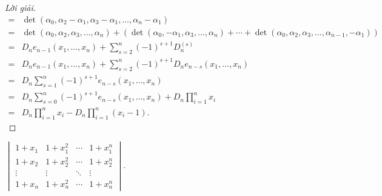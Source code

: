 \documentclass[class=nhvh-linear-algebra,crop=false]{standalone}
\begin{document}
\begin{proof}[Lời giải]
\begin{align*}
		= & \det(\alpha_{0}, \alpha_{2} - \alpha_{1}, \alpha_{3} - \alpha_{1}, \ldots, \alpha_{n} - \alpha_{1})                                                                                                                              \\
		= & \det(\alpha_{0}, \alpha_{2}, \alpha_{3}, \ldots, \alpha_{n}) + \left(\det(\alpha_{0}, -\alpha_{1}, \alpha_{3}, \ldots, \alpha_{n}) + \cdots + \det(\alpha_{0}, \alpha_{2}, \alpha_{3}, \ldots, \alpha_{n-1}, -\alpha_{1})\right) \\
		= & D_{n}e_{n-1}(x_{1}, \ldots, x_{n}) + \sum^{n}_{s=2}{(-1)}^{s+1}D^{(s)}_{n}                                                                                                                                                       \\
		= & D_{n}e_{n-1}(x_{1}, \ldots, x_{n}) + \sum^{n}_{s=2}{(-1)}^{s+1}D_{n}e_{n-s}(x_{1}, \ldots, x_{n})                                                                                                                                \\
		= & D_{n}\sum^{n}_{s=1}{(-1)}^{s+1}e_{n-s}(x_{1}, \ldots, x_{n})                                                                                                                                                                     \\
		= & D_{n}\sum^{n}_{s=0}{(-1)}^{s+1}e_{n-s}(x_{1}, \ldots, x_{n}) + D_{n}\prod^{n}_{i=1}x_{i}                                                                                                                                         \\
		= & D_{n}\prod^{n}_{i=1}x_{i} - D_{n}\prod^{n}_{i=1}(x_{i} - 1).
	\end{align*}
	\endgroup{}
\end{proof}

\begin{exercise}
	$\begin{vmatrix}
			1 + x_{1} & 1 + x_{1}^{2} & \cdots & 1 + x_{1}^{n} \\
			1 + x_{2} & 1 + x_{2}^{2} & \cdots & 1 + x_{2}^{n} \\
			\vdots    & \vdots        & \ddots & \vdots        \\
			1 + x_{n} & 1 + x_{n}^{2} & \cdots & 1 + x_{n}^{n}
		\end{vmatrix}$.
\end{exercise}
\end{document}
